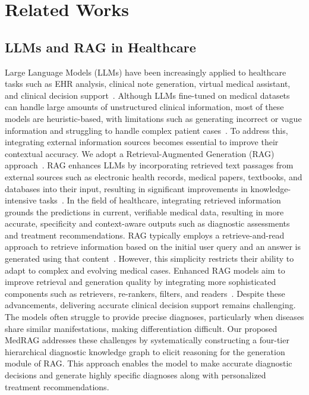 \section{Related Works}
\subsection{LLMs and RAG in Healthcare} 
Large Language Models (LLMs) have been increasingly applied to healthcare tasks such as EHR analysis, clinical note generation, virtual medical assistant, and clinical decision support~\cite{jiang2024tc,han2023medalpaca,yang2024talk2care,zhang2024llm,wangretcare}. Although LLMs fine-tuned on medical datasets can handle large amounts of unstructured clinical information, most of these models are heuristic-based, with limitations such as generating incorrect or vague information and struggling to handle complex patient cases~\cite{jiang2023active,yang2024talk2care}. To address this, integrating external information sources becomes essential to improve their contextual accuracy. We adopt a Retrieval-Augmented Generation (RAG) approach~\cite{lewis2020retrieval}. 
% 
RAG enhances LLMs by incorporating retrieved text passages from external sources such as electronic health records, medical papers, textbooks, and databases into their input, resulting in significant improvements in knowledge-intensive tasks~\cite{asai2023self}. In the field of healthcare, integrating retrieved information grounds the predictions in current, verifiable medical data, resulting in more accurate, specificity and context-aware outputs such as diagnostic assessments and treatment recommendations.
% 
RAG typically employs a retrieve-and-read approach to retrieve information based on the initial user query and an answer is generated using that content~\cite{khandelwal2019generalization, soman2023biomedical, sen2023knowledge,fan2024survey,gao2024two,zhao2024retrieval}. 
However, this simplicity restricts their ability to adapt to complex and evolving medical cases.
Enhanced RAG models aim to improve retrieval and generation quality by integrating more sophisticated components such as retrievers, re-rankers, filters, and readers~\cite{sarthi2024raptor,ma2023chain,cheng2021unitedqa, jiang2024hykge, yoran2023making,lewis2020retrieval}.
Despite these advancements, delivering accurate clinical decision support remains challenging. The models often struggle to provide precise diagnoses, particularly when diseases share similar manifestations, making differentiation difficult.
Our proposed MedRAG addresses these challenges by systematically constructing a four-tier hierarchical diagnostic knowledge graph to elicit reasoning for the generation module of RAG. This approach enables the model to make accurate diagnostic decisions and generate highly specific diagnoses along with personalized treatment recommendations.

